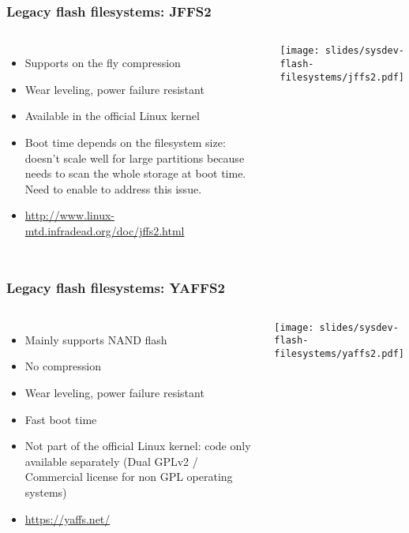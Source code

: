 \begin{frame}
  \frametitle{Legacy flash filesystems: JFFS2}
  \begin{columns}
    \begin{itemize}
    \item Supports on the fly compression
    \item Wear leveling, power failure resistant
    \item Available in the official Linux kernel
    \item Boot time depends on the filesystem size: doesn't scale well
      for large partitions because needs to scan the whole storage at
      boot time. Need to enable  to
      address this issue.
    \item \url{http://www.linux-mtd.infradead.org/doc/jffs2.html}
    \end{itemize}
    \texttt{[image: slides/sysdev-flash-filesystems/jffs2.pdf]}
  \end{columns}
\end{frame}

\begin{frame}
  \frametitle{Legacy flash filesystems: YAFFS2}
  \begin{columns}
    \begin{itemize}
    \item Mainly supports NAND flash
    \item No compression
    \item Wear leveling, power failure resistant
    \item Fast boot time
    \item Not part of the official Linux kernel: code only available
      separately (Dual GPLv2 / Commercial license for non GPL
      operating systems)
    \item \url{https://yaffs.net/}
    \end{itemize}
    \texttt{[image: slides/sysdev-flash-filesystems/yaffs2.pdf]}
  \end{columns}
\end{frame}


